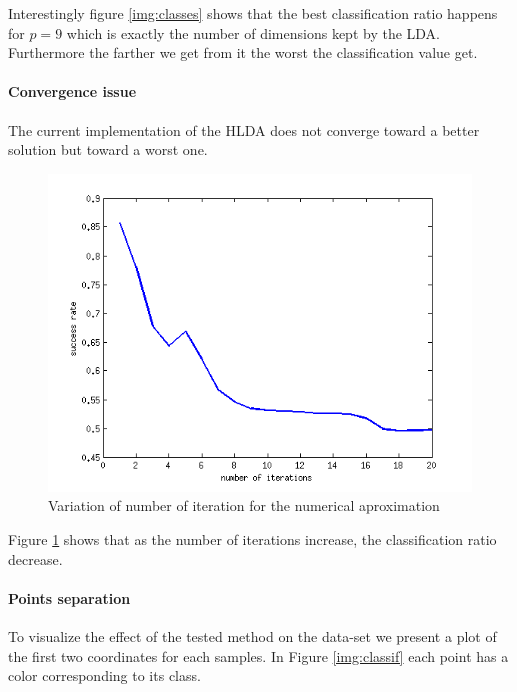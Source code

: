 Interestingly figure \ref{img:classes} shows that the best classification ratio happens for $p = 9$ which
is exactly the number of dimensions kept by the LDA. Furthermore the farther we get from
it the worst the classification value get.

\paragraph{Convergence issue} The current implementation of the HLDA does not converge toward a better
solution but toward a worst one.

\begin{figure}[H!]
  \includegraphics[scale=0.75]{img/bench-iterations}
  \caption{Variation of number of iteration for the numerical aproximation}
  \label{img:iter}
\end{figure}

Figure \ref{img:iter} shows that as the number of iterations increase, the classification ratio decrease.

\paragraph{Points separation} To visualize the effect of the tested method on the data-set we present a plot
of the first two coordinates for each samples. In Figure \ref{img:classif} each point has a color corresponding to its
class.

